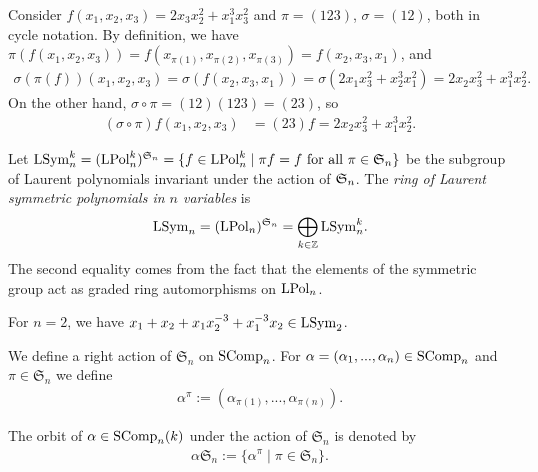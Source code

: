\documentclass[11pt]{amsart}
\begin{document}
\begin{eg}
    Consider $f(x_1, x_2, x_3)=2x_3x_2^2+x_1^3x_3^2$ and $\pi=(123)$, $\sigma=(12)$, both in cycle notation. By definition, we have $\pi (f(x_1, x_2, x_3))=f(x_{\pi(1)}, x_{\pi(2)}, x_{\pi(3)})=f(x_2, x_3, x_1)$, and 
    \begin{align*}
        \sigma(\pi(f))(x_1, x_2, x_3) =\sigma(f(x_2, x_3, x_1)) =\sigma (2x_1x_3^2+x_2^3x_1^2) = 2x_2x_3^2+x_1^3x_2^2.
    \end{align*}
    On the other hand, $\sigma \circ \pi=(12)(123)=(23)$, so 
    \begin{align}
        (\sigma \circ \pi) f(x_1, x_2, x_3)& =(23) f= 2x_2x_3^2+x_1^3x_2^2.
    \end{align}
\end{eg}

\begin{defin}\label{def:LSymkn}
    Let $\mathrm{LSym}_n^k=(\mathrm{LPol}_n^k)^{\mathfrak{S}_n}=\{f \in \mathrm{LPol}_n^k \mid \pi f=f \text{ for all } \pi \in \mathfrak{S}_n\}$ be the subgroup of Laurent polynomials invariant under the action of $\mathfrak{S}_n$.
    The \emph{ring of Laurent symmetric polynomials in $n$ variables} is 
    \begin{align}\label{eq:LauGrad}
        \mathrm{LSym}_n= (\mathrm{LPol}_n)^{\mathfrak{S}_n} = \bigoplus_{k \in \mathbb{Z}} \mathrm{LSym}_n^k.
    \end{align}
    The second equality comes from the fact that the elements of the symmetric group act as graded ring automorphisms on $\mathrm{LPol}_n$.
\end{defin}

\begin{eg}
     For $n=2$, we have $x_1+x_2+x_1x_2^{-3}+x_1^{-3}x_2 \in \mathrm{LSym}_2$.
\end{eg}

We define a right action of $\mathfrak{S}_n$ on $\mathrm{SComp}_n$. For $\alpha = (\alpha_1, . . . , \alpha_n) \in \mathrm{SComp}_n$ and $\pi \in \mathfrak{S}_n$ we define 
\begin{align}
    \alpha ^\pi := (\alpha_{\pi(1)}, . . .,\alpha_{\pi(n)}). \label{eq:alpha-pi}
\end{align}

The orbit of $\alpha \in\mathrm{SComp}_n(k)$ under the action of $\mathfrak{S}_n$ is denoted by 
\begin{align}
    \alpha\mathfrak{S}_n := \{ \alpha^\pi \mid \pi \in \mathfrak{S}_n\}.
\end{align}
\end{document}
